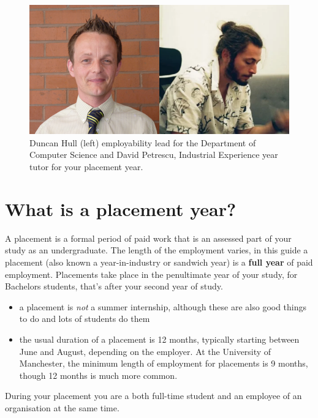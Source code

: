 \documentclass[
]{book}
\providecommand{\tightlist}{%
  \setlength{\itemsep}{0pt}\setlength{\parskip}{0pt}}
\begin{document}
\begin{figure}

{\centering \includegraphics[width=0.9\linewidth]{images/duncananddavid} 

}

\caption{Duncan Hull (left) employability lead for the Department of Computer Science and David Petrescu, Industrial Experience year tutor for your placement year.}\label{fig:team-fig}
\end{figure}



\section{What is a placement year?}\label{placement}

A placement is a formal period of paid work that is an assessed part of your study as an undergraduate. \citep{whatisie} The length of the employment varies, in this guide a placement (also known a year-in-industry or sandwich year) is a \textbf{full year} of paid employment. Placements take place in the penultimate year of your study, for Bachelors students, that's after your second year of study.

\begin{itemize}
\tightlist
\item
  a placement is \emph{not} a summer internship, although these are also good things to do and lots of students do them
\item
  the usual duration of a placement is 12 months, typically starting between June and August, depending on the employer. At the University of Manchester, the minimum length of employment for placements is 9 months, though 12 months is much more common.
\end{itemize}

During your placement you are a both full-time student and an employee of an organisation at the same time.
\end{document}
